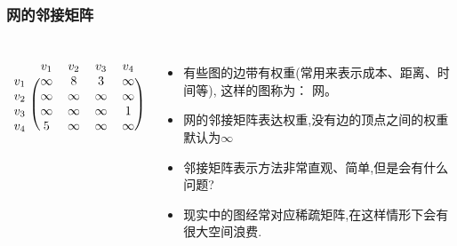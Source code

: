 \begin{frame}[fragile]
  \frametitle{网的邻接矩阵}
  \begin{columns}[T]
    \[
      \begin{blockarray}{ccccc}
        & v_1 & v_2 & v_3 & v_4 \\
        \begin{block}{c (c c c c)}
          v_1 & \infty & 8 & 3 & \infty \\
          v_2 & \infty & \infty & \infty & \infty \\
          v_3 & \infty & \infty & \infty & 1 \\
          v_4 & 5 & \infty & \infty & \infty \\
        \end{block}
      \end{blockarray}
    \]
    
    \begin{itemize}
    \item 有些图的边带有权重(常用来表示成本、距离、时间等), 这样的图称为：{\color{red} 网}。
    \item 网的邻接矩阵表达权重,没有边的顶点之间的权重默认为$\infty$
    \item 邻接矩阵表示方法非常直观、简单,但是会有什么问题? \pause
    \item 现实中的图经常对应稀疏矩阵,在这样情形下会有很大空间浪费.
    \end{itemize}
  \end{columns}  
\end{frame}

